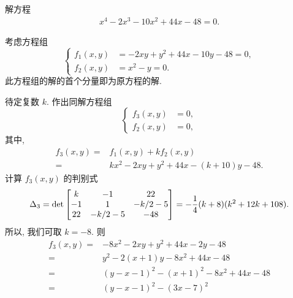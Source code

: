 \documentclass[../libro.tex]{subfiles}
\begin{document}
\begin{example}
    解方程
    \begin{align*}
        x^4 - 2x^3 - 10x^2 + 44x - 48 = 0.
    \end{align*}

    考虑方程组
    \begin{equation*}
        \left\{ %
        \begin{aligned}
            f_1 (x, y) & = -2xy + y^2 + 44x - 10y - 48 = 0, \\
            f_2 (x, y) & = x^2 - y = 0.
        \end{aligned}
        \right. %
    \end{equation*}
    此方程组的解的首个分量即为原方程的解.

    待定复数 \(k\).
    作出同解方程组
    \begin{equation*}
        \left\{ %
        \begin{aligned}
            f_3 (x, y) & = 0, \\
            f_2 (x, y) & = 0,
        \end{aligned}
        \right. %
    \end{equation*}
    其中,
    \begin{align*}
        f_3 (x, y)
        = {} & f_1 (x, y) + kf_2 (x, y)               \\
        = {} & kx^2 - 2xy + y^2 + 44x - (k+10)y - 48.
    \end{align*}
    计算 \(f_3 (x, y)\) 的判别式
    \begin{align*}
        \Delta_3
        =  \det
        \begin{bmatrix}
            k  & -1     & 22     \\
            -1 & 1      & -k/2-5 \\
            22 & -k/2-5 & -48    \\
        \end{bmatrix} 
        = -\frac{1}{4} (k + 8) (k^2 + 12k + 108).
    \end{align*}
    所以, 我们可取 \(k = -8\).
    则
    \begin{align*}
        f_3 (x, y)
        = {} & {-} 8x^2 - 2xy + y^2 + 44x - 2y - 48      \\
        = {} & y^2 - 2(x+1)y - 8x^2 + 44x - 48           \\
        = {} & (y - x - 1)^2 - (x+1)^2 - 8x^2 + 44x - 48 \\
        = {} & (y - x - 1)^2 - (3x - 7)^2                \\

\end{align*}
\end{example}
\end{document}
